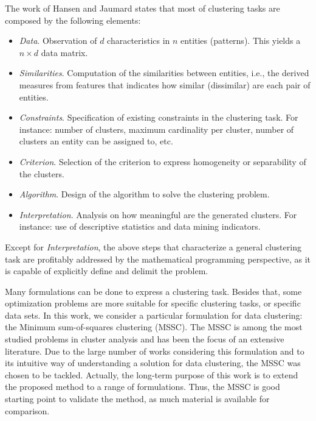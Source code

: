 The work of Hansen and Jaumard \cite{Hansen1997} states that most of clustering tasks are composed by the following elements:

\begin{itemize}

	\item \textit{Data}. Observation of $d$ characteristics in $n$ entities (patterns). This yields a $n \times d$ data matrix.

	\item \textit{Similarities}. Computation of the similarities between entities, i.e., the derived measures from features that indicates how similar (dissimilar) are each pair of entities.

	\item \textit{Constraints}. Specification of existing constraints in the clustering task. For instance: number of clusters, maximum cardinality per cluster, number of clusters an entity can be assigned to, etc.

	\item \textit{Criterion}. Selection of the criterion to express homogeneity or separability of the clusters.

	\item \textit{Algorithm}. Design of the algorithm to solve the clustering problem.

	\item \textit{Interpretation}. Analysis on how meaningful are the generated clusters. For instance: use of descriptive statistics and data mining indicators.

\end{itemize}

Except for \textit{Interpretation}, the above steps that characterize a general clustering task are profitably addressed by the mathematical programming perspective, as it is capable of explicitly define and delimit the problem.

Many formulations can be done to express a clustering task. Besides that, some optimization problems are more suitable for specific clustering tasks, or specific data sets. In this work, we consider a particular formulation for data clustering: the Minimum sum-of-squares clustering (MSSC). The MSSC is among the most studied problems in cluster analysis and has been the focus of an extensive literature. Due to the large number of works considering this formulation and to its intuitive way of understanding a solution for data clustering, the MSSC was chosen to be tackled. Actually, the long-term purpose of this work is to extend the proposed method to a range of formulations. Thus, the MSSC is good starting point to validate the method, as much material is available for comparison.

